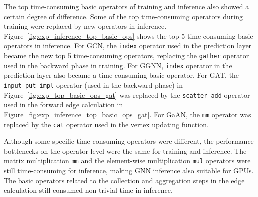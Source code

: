 The top time-consuming basic operators of training and inference also showed a certain degree of difference.
%
Some of the top time-consuming operators during training were replaced by new operators in inference.
%
Figure~\ref{fig:exp_inference_top_basic_ops} shows the top 5 time-consuming basic operators in inference.
%
For GCN, the \texttt{index} operator used in the prediction layer became the new top 5 time-consuming operators, replacing the \texttt{gather} operator used in the backward phase in training.
%
%
For GGNN, \texttt{index} operator in the prediction layer also became a time-consuming basic operator.
%
%
For GAT, the \texttt{input\_put\_impl} operator (used in the backward phase) in Figure~\ref{fig:exp_top_basic_ops_gat} was replaced by the \texttt{scatter\_add} operator used in the forward edge calculation in Figure~\ref{fig:exp_inference_top_basic_ops_gat}.
%
%
For GaAN, the \texttt{mm} operator was replaced by the \texttt{cat} operator used in the vertex updating function.

Although some specific time-consuming operators were different, the performance bottlenecks on the operator level were the same for training and inference.
%
The matrix multiplication \texttt{mm} and the element-wise multiplication \texttt{mul} operators were still time-consuming for inference, making GNN inference also {suitable for GPUs}.
%
The basic operators related to the collection and aggregation steps in the edge calculation still consumed non-trivial time in inference.

